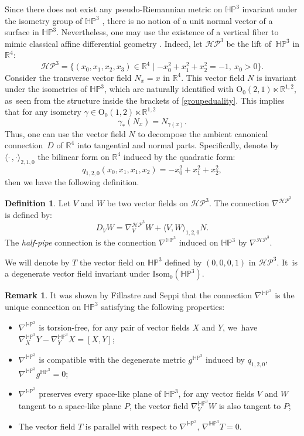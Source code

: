 \documentclass[JEP,XML,SOM,Unicode,NoEqCountersInSection, NoFloatCountersInSection,published]{cedram}
\theoremstyle{plain}
\theoremstyle{definition}
\newtheorem{defi}[cor]{Definition}
\newtheorem{remark}[cor]{Remark}
\newcommand{\minko}{\mathbb{R}^{1,2}}
\newcommand{\HP}{\mathbb{HP}^3}
\newcommand{\isom}{\mathrm{Isom}_0}
\newcommand{\inner}[1] {\langle #1 \rangle}
\begin{document}
Since there does not exist any pseudo-Riemannian metric on $\HP$ invariant under the isometry group of $\HP$ \cite[Fact 3.11]{fillastreseppi}, there is no notion of a unit normal vector of a surface in $\HP$. Nevertheless, one may use the existence of a vertical fiber to mimic classical affine differential geometry \cite{affine_diff_geometry}. Indeed, let $\mathcal{HP}^3$ be the lift of~$\HP$ in $\mathbb{R}^4$:
\[
\mathcal{HP}^3=\{(x_0,x_1,x_2,x_3)\in\mathbb{R}^4\mid -x_0^2+x_1^2+x_2^2=-1, \ x_0>0 \}.
\]
Consider the transverse vector field $N_x=x$ in $\mathbb{R}^4$. This vector field $N$ is invariant under the isometries of $\HP$, which are naturally identified with $\mathrm{O}_{0}(2,1)\ltimes\minko$, as~seen from the structure inside the brackets of \eqref{groupeduality}. This implies that for any isometry $\gamma\in\mathrm{O}_{0}(1,2)\ltimes\minko$
\[
\gamma_{*}(N_x) = N_{\gamma(x)}.
\]
Thus, one can use the vector field $N$ to decompose the ambient canonical connection~$D$ of $\mathbb{R}^4$ into tangential and normal parts. Specifically, denote by $\inner{\cdot\,,\cdot}_{2,1,0}$ the bilinear form on $\mathbb{R}^4$ induced by the quadratic form:
\[
q_{1,2,0}(x_0,x_1,x_1,x_2)=-x_0^2+x_1^2+x_2^2,
\]
then we have the following definition.

\begin{defi} Let $V$ and $W$ be two vector fields on $\mathcal{HP}^3$. The connection
$\nabla^{\mathcal{HP}^3}$ is defined by:
\[
D_VW=\nabla^{\mathcal{HP}^3}_VW+\inner{V,W}_{1,2,0}N.
\]
The \emph{half-pipe} connection is the connection $\nabla^{\HP}$
induced on $\HP$ by $\nabla^{\mathcal{HP}^3}$.
\end{defi}
We will denote by $T$ the vector field on $\HP$ defined by $(0, 0, 0, 1)$ in $\mathcal{HP}^3$. It~is a degenerate vector field invariant under $\isom(\HP)$.
\begin{remark}
It was shown by Fillastre and Seppi \cite[Props.\, 5.3 \& 5.11]{fillastreseppi} that the connection $\nabla^{\HP}$ is the unique connection on $\HP$ satisfying the following properties:
\begin{itemize}
\item $\nabla^{\HP}$ is torsion-free, \ie for any pair of vector fields $X$ and $Y$, we~have $\nabla^{\HP}_X Y - \nabla^{\HP}_Y X = [X, Y]$;
\item $\nabla^{\HP}$ is compatible with the degenerate metric $g^{\HP}$ induced by $q_{1,2,0}$, \ie $\nabla^{\HP} g^{\HP} = 0$;
\item $\nabla^{\HP}$ preserves every space-like plane of $\HP$, \ie for any vector fields $V$ and $W$ tangent to a space-like plane $P$, the vector field $\nabla^{\HP}_V W$ is also tangent to $P$;
\item The vector field $T$ is parallel with respect to $\nabla^{\HP}$, \ie $\nabla^{\HP} T = 0$.
\end{itemize}
\end{remark}
\end{document}
